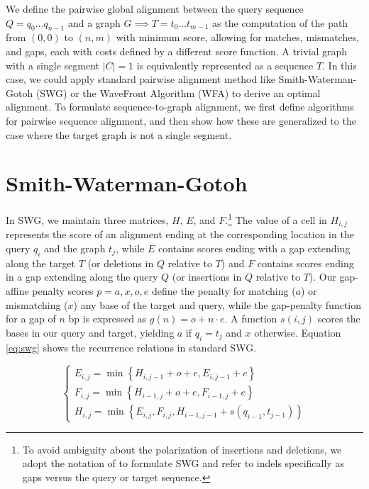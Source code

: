 \documentclass[10pt]{article}         %
\begin{document}
We define the pairwise global alignment between the query sequence $Q = q_0\ldots q_{n-1}$ and a graph $G \implies T = t_0\ldots t_{m-1}$ as the computation of the path from $(0, 0)$ to $(n, m)$ with minimum score, allowing for matches, mismatches, and gaps, each with costs defined by a different score function.
A trivial graph with a single segment $|C| = 1$ is equivalently represented as a sequence $T$.
In this case, we could apply standard pairwise alignment method like Smith-Waterman-Gotoh (SWG) \cite{smith1981comparison,gotoh1982improved} or the WaveFront Algorithm (WFA) \cite{Marco_Sola_2020} to derive an optimal alignment.
To formulate sequence-to-graph alignment, we first define algorithms for pairwise sequence alignment, and then show how these are generalized to the case where the target graph is not a single segment.

\section{Smith-Waterman-Gotoh}

In SWG, we maintain three matrices, $H$, $E$, and $F$.\footnote{To avoid ambiguity about the polarization of insertions and deletions, we adopt the notation of \cite{Farrar_2006} to formulate SWG and refer to indels specifically as gaps versus the query or target sequence.}
The value of a cell in $H_{i, j}$ represents the score of an alignment ending at the corresponding location in the query $q_i$ and the graph $t_j$, while $E$ contains scores ending with a gap extending along the target $T$ (or deletions in $Q$ relative to $T$) and $F$ contains scores ending in a gap extending along the query $Q$ (or insertions in $Q$ relative to $T$).
Our gap-affine penalty scores $p = {a, x, o, e}$ define the penalty for matching ($a$) or mismatching ($x$) any base of the target and query, while the gap-penalty function for a gap of $n$ bp is expressed as $g(n) = o + n \cdot e$.
A function $s(i, j)$ scores the bases in our query and target, yielding $a$ if $q_i = t_j$ and $x$ otherwise.
Equation \ref{eq:swg} shows the recurrence relations in standard SWG\@.

\begin{equation}
  \left\{\begin{array}{l}
  E_{i, j}=\min \left\{H_{i, j-1}+o+e, E_{i, j-1}+e\right\} \\
  F_{i, j}=\min \left\{H_{i-1, j}+o+e, F_{i-1, j}+e\right\} \\
  H_{i, j}=\min \left\{E_{i, j}, F_{i, j}, H_{i-1, j-1}+s\left(q_{i-1}, t_{j-1}\right)\right\}
  \end{array}\right.
  \label{eq:swg}
\end{equation}
\end{document}

